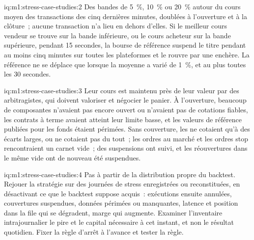 \begin{solution}{iq:m1:stress-case-studies:2}
Des bandes de 5~\%, 10~\% ou 20~\% autour du cours moyen des transactions des cinq dernières minutes,
doublées à l'ouverture et à la clôture~; aucune transaction n'a lieu en dehors d'elles. Si le
meilleur cours vendeur se trouve sur la bande inférieure, ou le cours acheteur sur la bande supérieure,
pendant 15 secondes, la bourse de référence suspend le titre pendant au moins cinq minutes
sur toutes les plateformes et le rouvre par une enchère. La référence ne se déplace que lorsque
la moyenne a varié de 1~\%, et au plus toutes les 30 secondes.
\end{solution}

\begin{solution}{iq:m1:stress-case-studies:3}
Leur cours est maintenu près de leur valeur par des arbitragistes, qui doivent valoriser et négocier le panier. À
l'ouverture, beaucoup de composantes n'avaient pas encore ouvert ou n'avaient pas de cotations fiables, les contrats
à terme avaient atteint leur limite basse, et les valeurs de référence publiées pour les fonds étaient périmées.
Sans couverture, les  ne cotaient qu'à des écarts larges, ou ne cotaient pas du tout~;
les ordres au marché et les ordres stop rencontraient un carnet vide~; des suspensions ont suivi, et
les réouvertures dans le même vide ont de nouveau été suspendues.
\end{solution}

\begin{solution}{iq:m1:stress-case-studies:4}
Pas à partir de la distribution propre du backtest. Rejouer la stratégie sur des
journées de stress enregistrées ou reconstituées, en désactivant ce que le backtest
suppose acquis~: exécutions ensuite annulées, couvertures suspendues, données périmées
ou manquantes, latence et position dans la file qui se dégradent, marge qui augmente.
Examiner l'inventaire intrajournalier le pire et le capital nécessaire à cet
instant, et non le résultat quotidien. Fixer la règle d'arrêt à l'avance et tester
la règle.
\end{solution}

